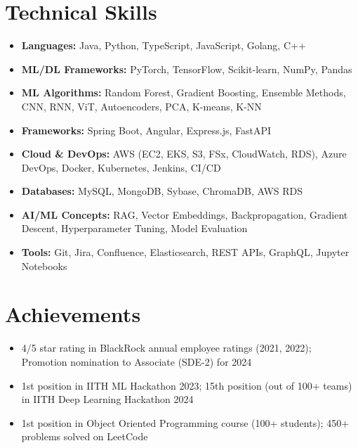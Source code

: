 \documentclass[11pt,a4paper]{article}
\newcommand{\resumeItem}[1]{\item\small{#1}}
\begin{document}
\section{Technical Skills}
\begin{itemize}[leftmargin=*,noitemsep,topsep=0pt]
    \resumeItem{\textbf{Languages:} Java, Python, TypeScript, JavaScript, Golang, C++}
    \resumeItem{\textbf{ML/DL Frameworks:} PyTorch, TensorFlow, Scikit-learn, NumPy, Pandas}
    \resumeItem{\textbf{ML Algorithms:} Random Forest, Gradient Boosting, Ensemble Methods, CNN, RNN, ViT, Autoencoders, PCA, K-means, K-NN}
    \resumeItem{\textbf{Frameworks:} Spring Boot, Angular, Express.js, FastAPI}
    \resumeItem{\textbf{Cloud \& DevOps:} AWS (EC2, EKS, S3, FSx, CloudWatch, RDS), Azure DevOps, Docker, Kubernetes, Jenkins, CI/CD}
    \resumeItem{\textbf{Databases:} MySQL, MongoDB, Sybase, ChromaDB, AWS RDS}
    \resumeItem{\textbf{AI/ML Concepts:} RAG, Vector Embeddings, Backpropagation, Gradient Descent, Hyperparameter Tuning, Model Evaluation}
    \resumeItem{\textbf{Tools:} Git, Jira, Confluence, Elasticsearch, REST APIs, GraphQL, Jupyter Notebooks}
\end{itemize}

\section{Achievements}
\begin{itemize}[leftmargin=*,noitemsep,topsep=0pt]
    \resumeItem{4/5 star rating in BlackRock annual employee ratings (2021, 2022); Promotion nomination to Associate (SDE-2) for 2024}
    \resumeItem{1st position in IITH ML Hackathon 2023; 15th position (out of 100+ teams) in IITH Deep Learning Hackathon 2024}
    \resumeItem{1st position in Object Oriented Programming course (100+ students); 450+ problems solved on LeetCode}
\end{itemize}
\end{document}
